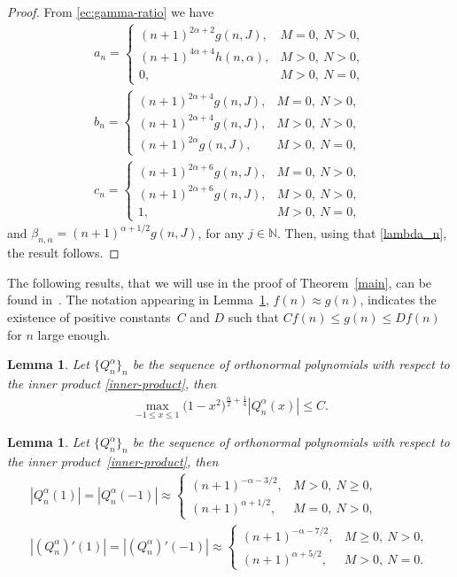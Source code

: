 \documentclass[pdftex]{sigma}
\newtheorem{lem}[thm]{Lemma}
\numberwithin{equation}{section}
\begin{document}
\begin{proof} From \eqref{ec:gamma-ratio} we have
\begin{gather*}
a_{n}= \begin{cases}
(n+1)^{2\alpha+2}g(n,J), & M=0, \ N>0,\\
(n+1)^{4\alpha+4}h(n,\alpha), & M>0, \ N>0,\\
0, & M>0, \ N=0,
\end{cases} \\
b_{n}= \begin{cases}
(n+1)^{2\alpha+4}g(n,J), & M=0, \ N>0,\\
(n+1)^{2\alpha+4}g(n,J), & M>0, \ N>0,\\
(n+1)^{2\alpha}g(n,J), & M>0, \ N=0,
\end{cases} \\
c_{n}= \begin{cases}
(n+1)^{2\alpha+6}g(n,J), & M=0, \ N>0,\\
(n+1)^{2\alpha+6}g(n,J), & M>0, \ N>0,\\
1, & M>0, \ N=0,
\end{cases}
\end{gather*}
and $\beta_{n,\alpha}=(n+1)^{\alpha+1/2}g(n,J)$, for any $j\in \mathbb{N}$. Then, using that \eqref{lambda_n}, the result follows.
\end{proof}

The following results, that we will use in the proof of Theorem~\ref{main}, can be found in~\cite{foulquie}. The notation appearing in Lemma~\ref{extremos}, $f(n)\approx g(n)$, indicates the existence of positive constants~$C$ and $D$ such that $Cf(n)\le g(n)\le Df(n)$ for $n$ large enough.

\begin{lem}\label{acotacionQ}
	Let $\{Q_n^{\alpha}\}_n$ be the sequence of orthonormal polynomials with respect to the inner product \eqref{inner-product}, then
	\begin{gather*}
	\max_{-1\le x\le 1}\big(1-x^2\big)^{\frac{\alpha}{2}+\frac{1}{4}}|Q_n^{\alpha}(x)|\le C.
	\end{gather*}
\end{lem}

\begin{lem}\label{extremos} Let $\{Q_n^{\alpha}\}_n$ be the sequence of orthonormal polynomials with respect to the inner product~\eqref{inner-product}, then
\begin{gather*}
|Q_n^{\alpha}(1)|=|Q_n^{\alpha}(-1)|\approx \begin{cases}
(n+1)^{-\alpha-3/2}, & M>0, \ N\ge 0,\\
(n+1)^{\alpha+1/2}, & M=0, \ N>0,
\end{cases}\\
|(Q_n^{\alpha})'(1)|=|(Q_n^{\alpha})'(-1)|\approx \begin{cases}
(n+1)^{-\alpha-7/2}, & M\ge 0, \ N> 0,\\
(n+1)^{\alpha+5/2}, & M>0, \ N=0.
\end{cases}
\end{gather*}
\end{lem}
\end{document}
